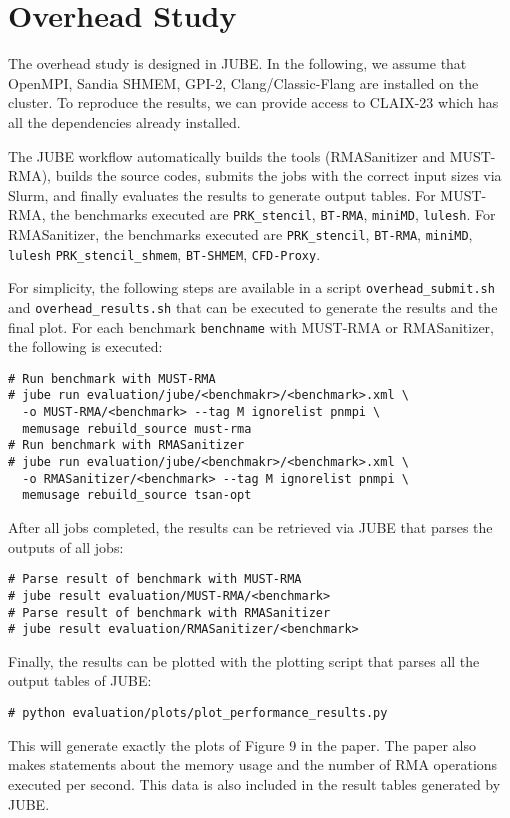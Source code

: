 \documentclass[twoside]{article}
\begin{document}
\section*{Overhead Study}
The overhead study is designed in JUBE.
In the following, we assume that OpenMPI, Sandia SHMEM, GPI-2, Clang/Classic-Flang are installed on the cluster.
To reproduce the results, we can provide access to CLAIX-23 which has all the dependencies already installed.

The JUBE workflow automatically builds the tools (RMASanitizer and MUST-RMA), builds the source codes, submits the jobs with the correct input sizes via Slurm, and finally evaluates the results to generate output tables.
For MUST-RMA, the benchmarks executed are \texttt{PRK\_stencil}, \texttt{BT-RMA}, \texttt{miniMD}, \texttt{lulesh}.
For RMASanitizer, the benchmarks executed are \texttt{PRK\_stencil}, \texttt{BT-RMA},  \texttt{miniMD}, \texttt{lulesh} \texttt{PRK\_stencil\_shmem}, \texttt{BT-SHMEM}, \texttt{CFD-Proxy}.

For simplicity, the following steps are available in a script \texttt{overhead\_submit.sh} and \texttt{overhead\_results.sh} that can be executed to generate the results and the final plot.
For each benchmark \texttt{benchname} with MUST-RMA or RMASanitizer, the following is executed:

{
\small
\begin{verbatim}
# Run benchmark with MUST-RMA
# jube run evaluation/jube/<benchmakr>/<benchmark>.xml \
  -o MUST-RMA/<benchmark> --tag M ignorelist pnmpi \ 
  memusage rebuild_source must-rma
# Run benchmark with RMASanitizer
# jube run evaluation/jube/<benchmakr>/<benchmark>.xml \
  -o RMASanitizer/<benchmark> --tag M ignorelist pnmpi \ 
  memusage rebuild_source tsan-opt
\end{verbatim}
}

After all jobs completed, the results can be retrieved via JUBE that parses the outputs of all jobs:

{
\small
\begin{verbatim}
# Parse result of benchmark with MUST-RMA
# jube result evaluation/MUST-RMA/<benchmark>
# Parse result of benchmark with RMASanitizer
# jube result evaluation/RMASanitizer/<benchmark>
\end{verbatim}
}

Finally, the results can be plotted with the plotting script that parses all the output tables of JUBE:
{
\small
\begin{verbatim}
# python evaluation/plots/plot_performance_results.py
\end{verbatim}
}

This will generate exactly the plots of Figure 9 in the paper. The paper also makes statements about the memory usage and the number of RMA operations executed per second. This data is also included in the result tables generated by JUBE.
\end{document}
